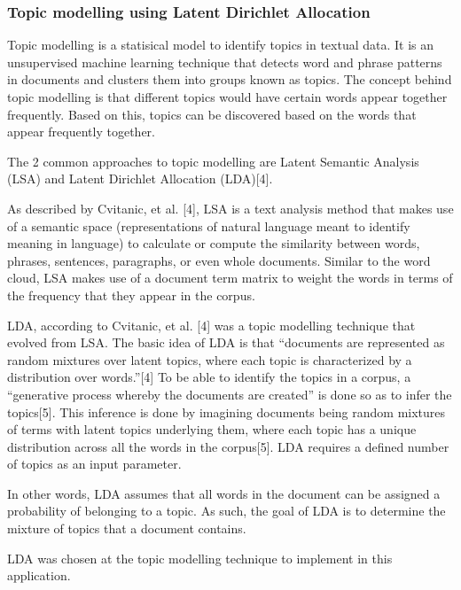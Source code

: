 \documentclass{acm_proc_article-sp}
\begin{document}
\hypertarget{topic-modelling-using-latent-dirichlet-allocation}{%
\subsubsection{Topic modelling using Latent Dirichlet
Allocation}\label{topic-modelling-using-latent-dirichlet-allocation}}

Topic modelling is a statisical model to identify topics in textual
data. It is an unsupervised machine learning technique that detects word
and phrase patterns in documents and clusters them into groups known as
topics. The concept behind topic modelling is that different topics
would have certain words appear together frequently. Based on this,
topics can be discovered based on the words that appear frequently
together.

The 2 common approaches to topic modelling are Latent Semantic Analysis
(LSA) and Latent Dirichlet Allocation (LDA){[}4{]}.

As described by Cvitanic, et al. {[}4{]}, LSA is a text analysis method
that makes use of a semantic space (representations of natural language
meant to identify meaning in language) to calculate or compute the
similarity between words, phrases, sentences, paragraphs, or even whole
documents. Similar to the word cloud, LSA makes use of a document term
matrix to weight the words in terms of the frequency that they appear in
the corpus.

LDA, according to Cvitanic, et al. {[}4{]} was a topic modelling
technique that evolved from LSA. The basic idea of LDA is that
``documents are represented as random mixtures over latent topics, where
each topic is characterized by a distribution over words.''{[}4{]} To be
able to identify the topics in a corpus, a ``generative process whereby
the documents are created'' is done so as to infer the topics{[}5{]}.
This inference is done by imagining documents being random mixtures of
terms with latent topics underlying them, where each topic has a unique
distribution across all the words in the corpus{[}5{]}. LDA requires a
defined number of topics as an input parameter.

In other words, LDA assumes that all words in the document can be
assigned a probability of belonging to a topic. As such, the goal of LDA
is to determine the mixture of topics that a document contains.

LDA was chosen at the topic modelling technique to implement in this
application.
\end{document}

